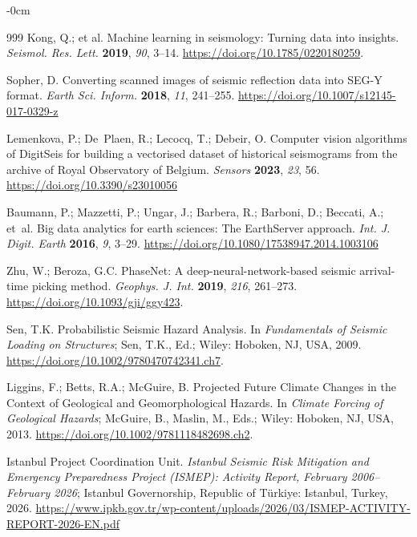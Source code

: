 \documentclass[data,article,accept,pdftex,moreauthors]{Definitions/mdpi}
\begin{document}
\begin{adjustwidth}{-\extralength}{0cm}
\begin{thebibliography}{999}
Kong, Q.; et al. Machine learning in seismology: Turning data into insights. \emph{Seismol. Res. Lett.} \textbf{2019}, \emph{90}, 3--14. \url{https://doi.org/10.1785/0220180259}.

Sopher, D. Converting scanned images of seismic reflection data into SEG-Y format. \emph{Earth Sci. Inform.} \textbf{2018}, \emph{11}, 241--255. \url{https://doi.org/10.1007/s12145-017-0329-z}

Lemenkova, P.; De~Plaen, R.; Lecocq, T.; Debeir, O. Computer vision algorithms of DigitSeis for building a vectorised dataset of historical seismograms from the archive of Royal Observatory of Belgium. \emph{Sensors} \textbf{2023}, \emph{23}, 56. \url{https://doi.org/10.3390/s23010056}

Baumann, P.; Mazzetti, P.; Ungar, J.; Barbera, R.; Barboni, D.; Beccati, A.; et~al. Big data analytics for earth sciences: The EarthServer approach. \emph{Int. J. Digit. Earth} \textbf{2016}, \emph{9}, 3--29. \url{https://doi.org/10.1080/17538947.2014.1003106}

Zhu, W.; Beroza, G.C. PhaseNet: A deep-neural-network-based seismic arrival-time picking method. \emph{Geophys. J. Int.} \textbf{2019}, \emph{216}, 261--273. \url{https://doi.org/10.1093/gji/ggy423}.

Sen, T.K. Probabilistic Seismic Hazard Analysis. In \emph{Fundamentals of Seismic Loading on Structures}; Sen, T.K., Ed.; Wiley: Hoboken, NJ, USA, %
2009. \url{https://doi.org/10.1002/9780470742341.ch7}.

Liggins, F.; Betts, R.A.; McGuire, B. Projected Future Climate Changes in the Context of Geological and Geomorphological Hazards. In \emph{Climate Forcing of Geological Hazards}; McGuire, B., Maslin, M., Eds.; Wiley: Hoboken, NJ, USA, %
 2013. \url{https://doi.org/10.1002/9781118482698.ch2}.

Istanbul Project Coordination Unit. \emph{Istanbul Seismic Risk Mitigation and Emergency Preparedness Project (ISMEP): Activity Report, February 2006--February 2026}; Istanbul Governorship, Republic of T\"{u}rkiye: Istanbul, Turkey, 2026. \url{https://www.ipkb.gov.tr/wp-content/uploads/2026/03/ISMEP-ACTIVITY-REPORT-2026-EN.pdf}


\end{thebibliography}
\end{adjustwidth}
\end{document}
